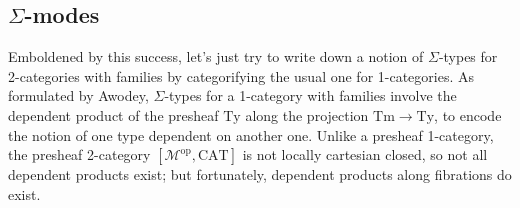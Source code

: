 \documentclass[10pt]{article}
\theoremstyle{definition}
\newcommand\op{^{\mathrm{op}}}
\newcommand\CAT{\mathrm{CAT}}
\newcommand\M{\mathcal{M}}
\begin{document}
\subsection{$\Sigma$-modes}
\label{sec:2-sigmas}


Emboldened by this success, let's just try to write down a notion of $\Sigma$-types for 2-categories with families by categorifying the usual one for 1-categories.
As formulated by Awodey, $\Sigma$-types for a 1-category with families involve the dependent product of the presheaf $\mathrm{Ty}$ along the projection $\mathrm{Tm}\to \mathrm{Ty}$, to encode the notion of one type dependent on another one.
Unlike a presheaf 1-category, the presheaf 2-category $[\M\op,\CAT]$ is not locally cartesian closed, so not all dependent products exist; but fortunately, dependent products along fibrations do exist.
\end{document}
